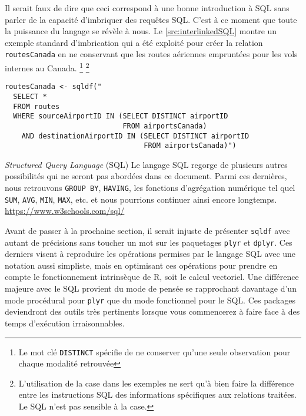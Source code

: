 \vspace{\baselineskip}
Il serait faux de dire que ceci correspond à une bonne introduction à SQL sans parler de la capacité d'imbriquer des requêtes SQL. C'est à ce moment que toute la puissance du langage se révèle à nous. Le \autoref{src:interlinkedSQL} montre un exemple standard d'imbrication qui a été exploité pour créer la relation \texttt{routesCanada} en ne conservant que les routes aériennes empruntées pour les vols internes au Canada. \footnote{Le mot clé \texttt{DISTINCT} spécifie de ne conserver qu'une seule observation pour chaque modalité retrouvée} \footnote{L'utilisation de la case dans les exemples ne sert qu'à bien faire la différence entre les instructions SQL des informations spécifiques aux relations traitées. Le SQL n'est pas sensible à la case.}

\begin{lstlisting}[caption = Fonctionnalités avancées de SQL,label=src:interlinkedSQL]
routesCanada <- sqldf("
  SELECT *
  FROM routes
  WHERE sourceAirportID IN (SELECT DISTINCT airportID
                            FROM airportsCanada)
    AND destinationAirportID IN (SELECT DISTINCT airportID
                                 FROM airportsCanada)")                           
\end{lstlisting}

\begin{moreInfo}{\emph{Structured Query Language} (SQL)}
	Le langage SQL regorge de plusieurs autres possibilités qui ne seront pas abordées dans ce document. Parmi ces dernières, nous retrouvons \texttt{GROUP BY}, \texttt{HAVING}, les fonctions d'agrégation numérique tel quel \texttt{SUM}, \texttt{AVG}, \texttt{MIN}, \texttt{MAX}, etc. et nous pourrions continuer ainsi encore longtemps. \\
	\url{https://www.w3schools.com/sql/}
\end{moreInfo}

Avant de passer à la prochaine section, il serait injuste de présenter \texttt{sqldf} avec autant de précisions sans toucher un mot sur les paquetages \texttt{plyr} et \texttt{dplyr}. Ces derniers visent à reproduire les opérations permises par le langage SQL avec une notation aussi simpliste, mais en optimisant ces opérations pour prendre en compte le fonctionnement intrinsèque de R, soit le calcul vectoriel. Une différence majeure avec le SQL provient du mode de pensée se rapprochant davantage d'un mode procédural pour \texttt{plyr} que du mode fonctionnel pour le SQL. Ces packages deviendront des outils très pertinents lorsque vous commencerez à faire face à des temps d'exécution irraisonnables. \cite{dplyrVSsqldf}

